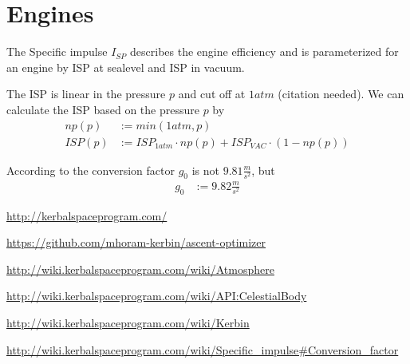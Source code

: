 \documentclass[11pt]{article}
\begin{document}
\section{Engines}

The Specific impulse $I_{SP}$ describes the engine efficiency and is
parameterized for an engine by ISP at sealevel and ISP in vacuum.

The ISP is linear in the pressure $p$ and cut off at $1atm$
(citation needed).  We can calculate the ISP based on the pressure
$p$ by
\begin{align}
  np(p) &:= min(1 atm, p)\\
  ISP(p) &:= ISP_{1atm} \cdot np(p) + ISP_{VAC} \cdot (1-np(p))
\end{align}

According to \cite{ECF} the conversion factor $g_0$ is not
$9.81\frac{m}{s^2}$, but
\begin{align}
  g_0 &:= 9.82\frac{m}{s^2}
\end{align}

\begin{thebibliography}{Kerbin}

  \url{http://kerbalspaceprogram.com/}

  \url{https://github.com/mhoram-kerbin/ascent-optimizer}

  \url{http://wiki.kerbalspaceprogram.com/wiki/Atmosphere}

  \url{http://wiki.kerbalspaceprogram.com/wiki/API:CelestialBody}

  \url{http://wiki.kerbalspaceprogram.com/wiki/Kerbin}

  \url{http://wiki.kerbalspaceprogram.com/wiki/Specific_impulse#Conversion_factor}

\end{thebibliography}
\end{document}

